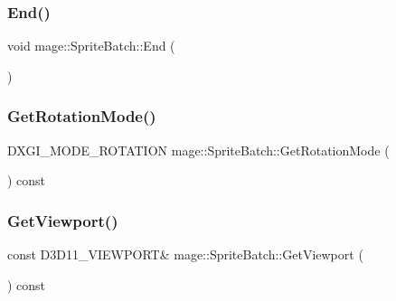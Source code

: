 \hypertarget{classmage_1_1_sprite_batch_a9764372bb18b1c24a4a2f64ab0649569}{}\label{classmage_1_1_sprite_batch_a9764372bb18b1c24a4a2f64ab0649569} 
\subsubsection{\texorpdfstring{End()}{End()}}
{\footnotesize\ttfamily void mage\+::\+Sprite\+Batch\+::\+End (\begin{DoxyParamCaption}{ }\end{DoxyParamCaption})}

\hypertarget{classmage_1_1_sprite_batch_ade698c44432d175ca55a4545b9adae85}{}\label{classmage_1_1_sprite_batch_ade698c44432d175ca55a4545b9adae85} 
\subsubsection{\texorpdfstring{Get\+Rotation\+Mode()}{GetRotationMode()}}
{\footnotesize\ttfamily D\+X\+G\+I\+\_\+\+M\+O\+D\+E\+\_\+\+R\+O\+T\+A\+T\+I\+ON mage\+::\+Sprite\+Batch\+::\+Get\+Rotation\+Mode (\begin{DoxyParamCaption}{ }\end{DoxyParamCaption}) const}

\hypertarget{classmage_1_1_sprite_batch_a67bdd7fb00644aefb3c7ecfaa7923a39}{}\label{classmage_1_1_sprite_batch_a67bdd7fb00644aefb3c7ecfaa7923a39} 
\subsubsection{\texorpdfstring{Get\+Viewport()}{GetViewport()}}
{\footnotesize\ttfamily const D3\+D11\+\_\+\+V\+I\+E\+W\+P\+O\+RT\& mage\+::\+Sprite\+Batch\+::\+Get\+Viewport (\begin{DoxyParamCaption}{ }\end{DoxyParamCaption}) const}

\hypertarget{classmage_1_1_sprite_batch_ae0932c59e74e73c1644e2982932150f8}{}\label{classmage_1_1_sprite_batch_ae0932c59e74e73c1644e2982932150f8} 
